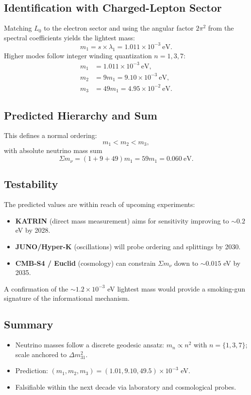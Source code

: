 \documentclass{article}
\numberwithin{equation}{section}
\theoremstyle{plain}
\theoremstyle{definition}
\theoremstyle{remark}
\begin{document}
\subsection{Identification with Charged-Lepton Sector}
Matching $L_0$ to the electron sector and using the angular factor $2\pi^2$ from the spectral coefficients yields the lightest mass:
\begin{equation}
m_1 = s \times \lambda_1 = 1.011\times 10^{-3}~\text{eV}.
\end{equation}
Higher modes follow integer winding quantization $n = 1, 3, 7$:
\begin{align}
m_1 &= 1.011\times 10^{-3}~\text{eV}, \\
m_2 &= 9 m_1 = 9.10\times 10^{-3}~\text{eV}, \\
m_3 &= 49 m_1 = 4.95\times 10^{-2}~\text{eV}.
\end{align}

\subsection{Predicted Hierarchy and Sum}
This defines a normal ordering:
\begin{equation}
m_1 < m_2 < m_3,
\end{equation}
with absolute neutrino mass sum
\begin{equation}
\Sigma m_\nu = (1+9+49)m_1 = 59 m_1 = 0.060~\text{eV}.
\end{equation}

\subsection{Testability}
The predicted values are within reach of upcoming experiments:
\begin{itemize}
    \item \textbf{KATRIN} (direct mass measurement) aims for sensitivity improving to $\sim 0.2$ eV by 2028.
    \item \textbf{JUNO/Hyper-K} (oscillations) will probe ordering and splittings by 2030.
    \item \textbf{CMB-S4 / Euclid} (cosmology) can constrain $\Sigma m_\nu$ down to $\sim 0.015$ eV by 2035.
\end{itemize}
A confirmation of the $\sim 1.2\times 10^{-3}$ eV lightest mass would provide a smoking-gun signature of the informational mechanism.

\subsection{Summary}
\begin{itemize}
    \item Neutrino masses follow a discrete geodesic ansatz: $m_n\propto n^2$ with $n=\{1,3,7\}$; scale anchored to $\Delta m_{31}^2$.
    \item Prediction: $(m_1, m_2, m_3) = (1.01, 9.10, 49.5)\times 10^{-3}$ eV.
    \item Falsifiable within the next decade via laboratory and cosmological probes.
\end{itemize}
\end{document}
